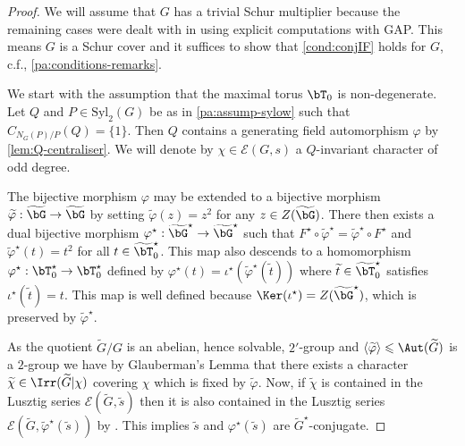\documentclass[eqthmnum, nocolour]{jt-calcs}
\newcommand{\syl}{\mathrm{Syl}}
\begin{document}
\begin{proof}
We will assume that $G$ has a trivial Schur multiplier because the remaining cases were dealt with in \cite[\S4]{schaeffer-fry:2015:odd-degree-characters} using explicit computations with {\sf GAP}. This means $G$ is a Schur cover and it suffices to show that \cref{cond:conjIF} holds for $G$, c.f., \cref{pa:conditions-remarks}.

We start with the assumption that the maximal torus $\bT_0$ is non-degenerate. Let $Q$ and $P \in \syl_2(G)$ be as in \cref{pa:assump-sylow} such that $C_{N_G(P)/P}(Q)=\{1\}$.  Then $Q$ contains a generating field automorphism $\varphi$ by \cref{lem:Q-centraliser}. We will denote by $\chi \in \mathcal{E}(G,s)$ a $Q$-invariant character of odd degree.

The bijective morphism $\varphi$ may be extended to a bijective morphism $\widetilde{\varphi} : \widetilde{\bG} \to \widetilde{\bG}$ by setting $\widetilde{\varphi}(z) = z^2$ for any $z \in Z(\widetilde{\bG})$. There then exists a dual bijective morphism $\varphi^{\star} : \widetilde{\bG}^{\star} \to \widetilde{\bG}^{\star}$ such that $F^{\star}\circ \widetilde{\varphi}^{\star} = \widetilde{\varphi}^{\star}\circ F^{\star}$ and $\widetilde{\varphi}^{\star}(t) = t^2$ for all $t \in \widetilde{\bT}_0^{\star}$. This map also descends to a homomorphism $\varphi^{\star} : \bT_0^{\star} \to \bT_0^{\star}$ defined by $\varphi^{\star}(t) = \iota^{\star}(\widetilde{\varphi}^{\star}(\widetilde{t}))$ where $\widetilde{t} \in \widetilde{\bT}_0^{\star}$ satisfies $\iota^{\star}(\widetilde{t}) = t$. This map is well defined because $\Ker(\iota^{\star}) = Z(\widetilde{\bG}^{\star})$, which is preserved by $\widetilde{\varphi}^{\star}$.

As the quotient $\widetilde{G}/G$ is an abelian, hence solvable, $2'$-group and $\langle \widetilde{\varphi}\rangle \leqslant \Aut(\widetilde{G})$ is a $2$-group we have by Glauberman's Lemma \cite[13.28]{isaacs:2006:character-theory-of-finite-groups} that there exists a character $\widetilde{\chi} \in \Irr(\widetilde{G}|\chi)$ covering $\chi$ which is fixed by $\widetilde{\varphi}$. Now, if $\widetilde{\chi}$ is contained in the Lusztig series $\mathcal{E}(\widetilde{G},\widetilde{s})$ then it is also contained in the Lusztig series $\mathcal{E}(\widetilde{G},\widetilde{\varphi}^{\star}(\widetilde{s}))$ by \cite[2.4]{navarro-tiep-turull:2008:brauer-characters-with-cyclotomic}. This implies $\widetilde{s}$ and $\varphi^{\star}(\widetilde{s})$ are $\widetilde{G}^{\star}$-conjugate.


\end{proof}
\end{document}
